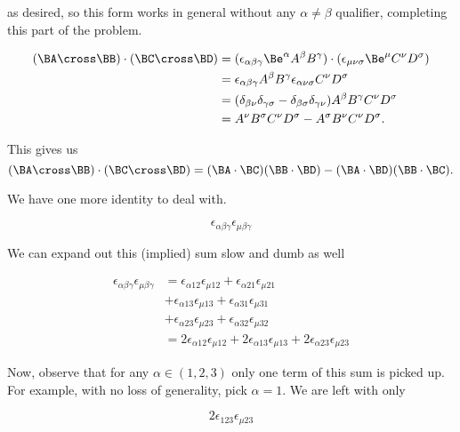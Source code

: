 as desired, so this form works in general without any $\alpha \ne \beta$ qualifier, completing this part of the problem.

\begin{align*}
(\BA \cross \BB) \cdot (\BC \cross \BD)
&=
(\epsilon_{\alpha \beta \gamma} \Be^\alpha A^\beta B^\gamma ) \cdot
(\epsilon_{\mu \nu \sigma} \Be^\mu C^\nu D^\sigma ) \\
&=
\epsilon_{\alpha \beta \gamma} A^\beta B^\gamma
\epsilon_{\alpha \nu \sigma} C^\nu D^\sigma \\
&=
(
\delta_{\beta \nu} \delta_{\gamma\sigma}
-\delta_{\beta \sigma} \delta_{\gamma\nu} )
A^\beta B^\gamma
C^\nu D^\sigma \\
&=
A^\nu B^\sigma
C^\nu D^\sigma
-A^\sigma B^\nu
C^\nu D^\sigma.
\end{align*}

This gives us
\begin{equation}\label{eqn:relElectroDynProblemSet3:n}
(\BA \cross \BB) \cdot (\BC \cross \BD)
=
(\BA \cdot \BC)
(\BB \cdot \BD)
-
(\BA \cdot \BD)
(\BB \cdot \BC).
\end{equation}

We have one more identity to deal with.

\begin{equation}\label{eqn:relElectroDynProblemSet3:n}
\epsilon_{\alpha \beta \gamma}
\epsilon_{\mu \beta \gamma}
\end{equation}

We can expand out this (implied) sum slow and dumb as well

\begin{align*}
\epsilon_{\alpha \beta \gamma}
\epsilon_{\mu \beta \gamma}
&=
\epsilon_{\alpha 1 2} \epsilon_{\mu 1 2}
+\epsilon_{\alpha 2 1} \epsilon_{\mu 2 1} \\
&+\epsilon_{\alpha 1 3} \epsilon_{\mu 1 3}
+\epsilon_{\alpha 3 1} \epsilon_{\mu 3 1} \\
&+\epsilon_{\alpha 2 3} \epsilon_{\mu 2 3}
+\epsilon_{\alpha 3 2} \epsilon_{\mu 3 2} \\
&=
2 \epsilon_{\alpha 1 2} \epsilon_{\mu 1 2}
+ 2 \epsilon_{\alpha 1 3} \epsilon_{\mu 1 3}
+ 2 \epsilon_{\alpha 2 3} \epsilon_{\mu 2 3}
\end{align*}

Now, observe that for any $\alpha \in (1,2,3)$ only one term of this sum is picked up.  For example, with no loss of generality, pick $\alpha = 1$.  We are left with only

\begin{equation}\label{eqn:relElectroDynProblemSet3:n}
2 \epsilon_{1 2 3} \epsilon_{\mu 2 3}
\end{equation}

